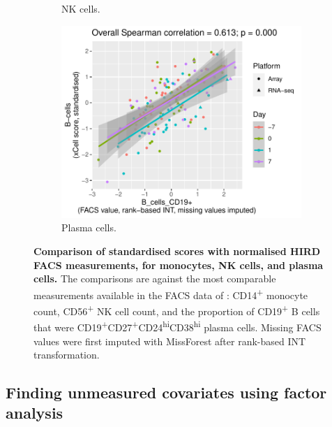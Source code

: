 \begin{figure}
\begin{subfigure}[b]{0.43\textwidth}
        \caption[]{\gls{NK} cells.}
    \end{subfigure}
    \bigskip\vfill
    \begin{subfigure}[b]{0.43\textwidth}
        \centering
        \includegraphics[width=1.0\textwidth,page=2]{mainmatter/figures/chapter_03/validate_xCell_estimates.cell_type_pairs.pdf}
        \caption[]{Plasma cells.}
    \end{subfigure}
    \caption[
    ]{
        \textbf{Comparison of standardised  scores with normalised \gls{HIRD} \gls{FACS} measurements, for monocytes, \gls{NK} cells, and plasma cells.}
        The comparisons are against the most comparable measurements available in the \gls{FACS} data of \textcite{sobolev2016AdjuvantedInfluenzaH1N1Vaccination}: 
        CD14\textsuperscript{+} monocyte count,
        CD56\textsuperscript{+} \gls{NK} cell count,
        and the proportion of CD19\textsuperscript{+} B cells that were CD19\textsuperscript{+}CD27\textsuperscript{+}CD24\textsuperscript{hi}CD38\textsuperscript{hi} plasma cells.
        Missing \gls{FACS} values were first imputed with MissForest after rank-based \gls{INT} transformation.
    }
    \label{fig:hird_xCell_vs_FACS}
\end{figure}

\subsection{Finding unmeasured covariates using factor analysis}
\label{subsec:hird_reQTL_PEER}

